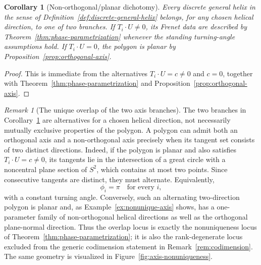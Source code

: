 \documentclass[10pt,a4paper]{amsart}
\newtheorem{corollary}[theorem]{Corollary}
\theoremstyle{definition}
\theoremstyle{remark}
\newtheorem{remark}[theorem]{Remark}
\numberwithin{equation}{section}
\begin{document}
\begin{corollary}[Non-orthogonal/planar dichotomy]\label{cor:dichotomy}
Every discrete general helix in the sense of Definition~\ref{def:discrete-general-helix} belongs, for any chosen helical direction, to one of two branches. If $T_i\cdot U\ne0$, its Frenet data are described by Theorem~\ref{thm:phase-parametrization} whenever the standing turning-angle assumptions hold. If $T_i\cdot U=0$, the polygon is planar by Proposition~\ref{prop:orthogonal-axis}.
\end{corollary}

\begin{proof}
This is immediate from the alternatives $T_i\cdot U=c\ne0$ and $c=0$, together with Theorem~\ref{thm:phase-parametrization} and Proposition~\ref{prop:orthogonal-axis}.
\end{proof}

\begin{remark}[The unique overlap of the two axis branches]\label{rem:branch-overlap}
The two branches in Corollary~\ref{cor:dichotomy} are alternatives for a chosen helical direction, not necessarily mutually exclusive properties of the polygon.  A polygon can admit both an orthogonal axis and a non-orthogonal axis precisely when its tangent set consists of two distinct directions. Indeed, if the polygon is planar and also satisfies $T_i\cdot U=c\ne0$, its tangents lie in the intersection of a great circle with a noncentral plane section of $S^2$, which contains at most two points. Since consecutive tangents are distinct, they must alternate. Equivalently,
\[
\phi_i=\pi\quad\text{for every }i,
\]
with a constant turning angle. Conversely, such an alternating two-direction polygon is planar and, as Example~\ref{ex:nonunique-axis} shows, has a one-parameter family of non-orthogonal helical directions as well as the orthogonal plane-normal direction. Thus the overlap locus is exactly the nonuniqueness locus of Theorem~\ref{thm:phase-parametrization}; it is also the rank-degenerate locus excluded from the generic codimension statement in Remark~\ref{rem:codimension}.  The same geometry is visualized in Figure~\ref{fig:axis-nonuniqueness}.
\end{remark}
\end{document}
